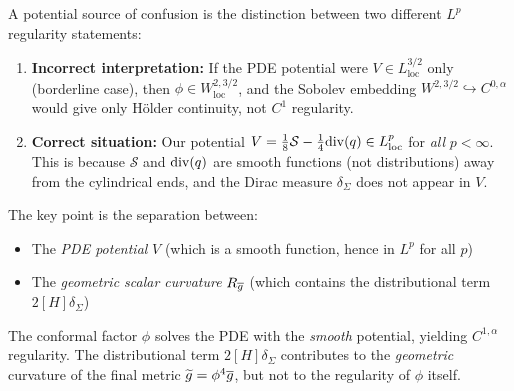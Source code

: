 \begin{remark}\label{rem:SobolevClarification}
A potential source of confusion is the distinction between two different $L^p$ regularity statements:
\begin{enumerate}
    \item \textbf{Incorrect interpretation:} If the PDE potential were $V \in L^{3/2}_{\text{loc}}$ only (borderline case), then $\phi \in W^{2,3/2}_{\text{loc}}$, and the Sobolev embedding $W^{2,3/2} \hookrightarrow C^{0,\alpha}$ would give only H\"older continuity, not $C^1$ regularity.
    
    \item \textbf{Correct situation:} Our potential $V = \frac{1}{8}\mathcal{S} - \frac{1}{4}\mathrm{div}(q) \in L^p_{\text{loc}}$ for \emph{all} $p < \infty$. This is because $\mathcal{S}$ and $\mathrm{div}(q)$ are smooth functions (not distributions) away from the cylindrical ends, and the Dirac measure $\delta_\Sigma$ does not appear in $V$.
\end{enumerate}

The key point is the separation between:
\begin{itemize}
    \item The \emph{PDE potential} $V$ (which is a smooth function, hence in $L^p$ for all $p$)
    \item The \emph{geometric scalar curvature} $R_{\overline{g}}$ (which contains the distributional term $2[H]\delta_\Sigma$)
\end{itemize}

The conformal factor $\phi$ solves the PDE with the \emph{smooth} potential, yielding $C^{1,\alpha}$ regularity. The distributional term $2[H]\delta_\Sigma$ contributes to the \emph{geometric} curvature of the final metric $\widetilde{g} = \phi^4 \overline{g}$, but not to the regularity of $\phi$ itself.
\end{remark}

